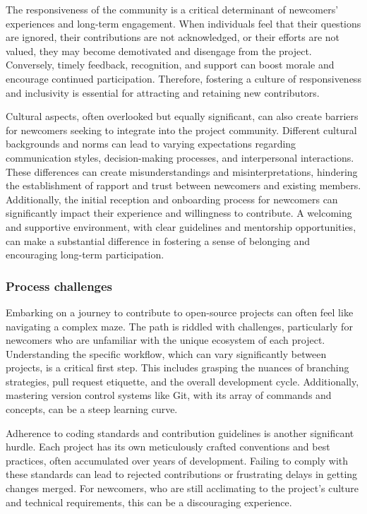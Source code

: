 The responsiveness of the community is a critical determinant of newcomers' experiences and long-term engagement. When individuals feel that their questions are ignored, their contributions are not acknowledged, or their efforts are not valued, they may become demotivated and disengage from the project. Conversely, timely feedback, recognition, and support can boost morale and encourage continued participation. Therefore, fostering a culture of responsiveness and inclusivity is essential for attracting and retaining new contributors.

Cultural aspects, often overlooked but equally significant, can also create barriers for newcomers seeking to integrate into the project community. Different cultural backgrounds and norms can lead to varying expectations regarding communication styles, decision-making processes, and interpersonal interactions. These differences can create misunderstandings and misinterpretations, hindering the establishment of rapport and trust between newcomers and existing members. Additionally, the initial reception and onboarding process for newcomers can significantly impact their experience and willingness to contribute. A welcoming and supportive environment, with clear guidelines and mentorship opportunities, can make a substantial difference in fostering a sense of belonging and encouraging long-term participation.


\subsubsection{Process challenges}

Embarking on a journey to contribute to open-source projects can often feel like navigating a complex maze. The path is riddled with challenges, particularly for newcomers who are unfamiliar with the unique ecosystem of each project. Understanding the specific workflow, which can vary significantly between projects, is a critical first step. This includes grasping the nuances of branching strategies, pull request etiquette, and the overall development cycle. Additionally, mastering version control systems like Git, with its array of commands and concepts, can be a steep learning curve.

Adherence to coding standards and contribution guidelines is another significant hurdle. Each project has its own meticulously crafted conventions and best practices, often accumulated over years of development. Failing to comply with these standards can lead to rejected contributions or frustrating delays in getting changes merged. For newcomers, who are still acclimating to the project's culture and technical requirements, this can be a discouraging experience.

